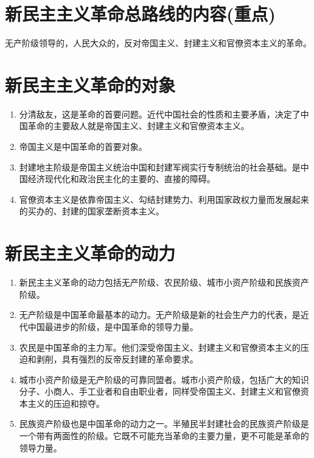 \documentclass[12pt, a4paper, oneside]{ctexbook}
\begin{document}
\section{新民主主义革命总路线的内容(重点)}

无产阶级领导的，人民大众的，反对帝国主义、封建主义和官僚资本主义的革命。

\section{新民主主义革命的对象}

\begin{enumerate}[label=（\arabic*）]
\item 分清敌友，这是革命的首要问题。近代中国社会的性质和主要矛盾，决定了中国革命的主要敌人就是帝国主义、封建主义和官僚资本主义。

\item 帝国主义是中国革命的首要对象。

\item 封建地主阶级是帝国主义统治中国和封建军阀实行专制统治的社会基础。是中国经济现代化和政治民主化的主要的、直接的障碍。

\item 官僚资本主义是依靠帝国主义、勾结封建势力、利用国家政权力量而发展起来的买办的、封建的国家垄断资本主义。
\end{enumerate}

\section{新民主主义革命的动力}

\begin{enumerate}[label=（\arabic*）]
\item 新民主主义革命的动力包括无产阶级、农民阶级、城市小资产阶级和民族资产阶级。

\item 无产阶级是中国革命最基本的动力。无产阶级是新的社会生产力的代表，是近代中国最进步的阶级，是中国革命的领导力量。

\item 农民是中国革命的主力军。他们深受帝国主义、封建主义和官僚资本主义的压迫和剥削，具有强烈的反帝反封建的革命要求。

\item 城市小资产阶级是无产阶级的可靠同盟者。城市小资产阶级，包括广大的知识分子、小商人、手工业者和自由职业者，同样受帝国主义、封建主义和官僚资本主义的压迫和掠夺。

\item 民族资产阶级也是中国革命的动力之一。半殖民半封建社会的民族资产阶级是一个带有两面性的阶级。它既不可能充当革命的主要力量，更不可能是革命的领导力量。
\end{enumerate}
\end{document}
